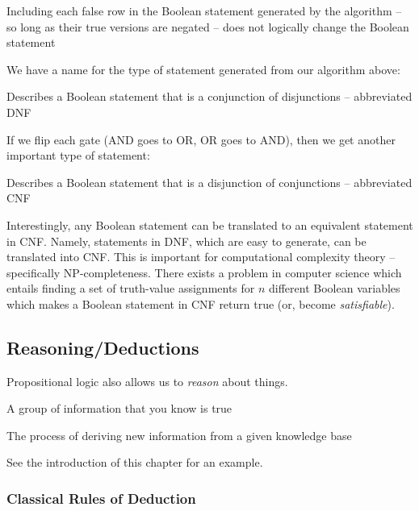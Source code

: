 \documentclass[main.tex]{subfiles}
\begin{document}
\begin{rem}
	Including each false row in the Boolean statement generated by the algorithm -- so long as their true versions are negated -- does not logically change the Boolean statement
\end{rem}

We have a name for the type of statement generated from our algorithm above:

\begin{defn}
	Describes a Boolean statement that is a conjunction of disjunctions -- abbreviated DNF
\end{defn}

If we flip each gate (AND goes to OR, OR goes to AND), then we get another important type of statement:

\begin{defn}
	Describes a Boolean statement that is a disjunction of conjunctions -- abbreviated CNF
\end{defn}

Interestingly, any Boolean statement can be translated to an equivalent statement in CNF. Namely, statements in DNF, which are easy to generate, can be translated into CNF. This is important for computational complexity theory -- specifically NP-completeness. There exists a problem in computer science which entails finding a set of truth-value assignments for \(n\) different Boolean variables which makes a Boolean statement in CNF return true (or, become \textit{satisfiable}).

\subsection{Reasoning/Deductions}
\label{section:reasoning}

Propositional logic also allows us to \textit{reason} about things.

\begin{defn}
	A group of information that you know is true
\end{defn}

\begin{defn}[Reasoning]
	The process of deriving new information from a given knowledge base
\end{defn}

See the introduction of this chapter for an example.

\subsubsection{Classical Rules of Deduction}
\end{document}
